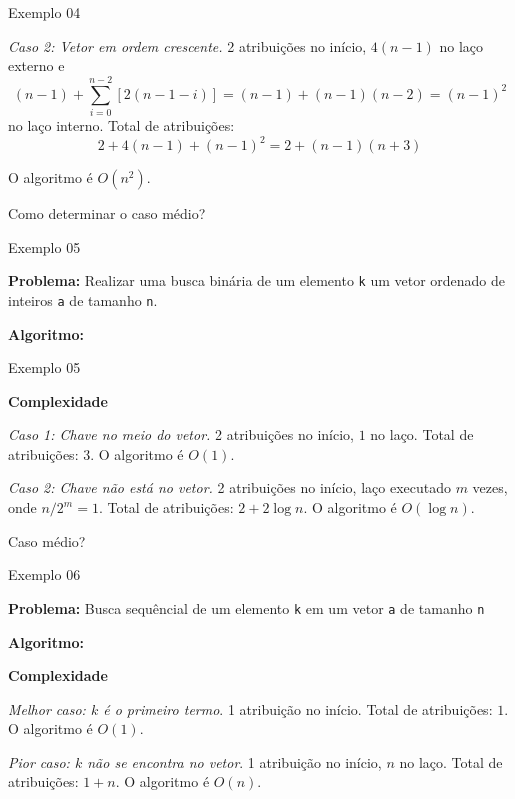 \begin{frame}[fragile]{Exemplo 04}

    {\it Caso 2: Vetor em ordem crescente.} 2 atribuições no 
    início, $4(n-1)$ no laço externo e 
    \[(n - 1) + \sum_{i=0}^{n-2} \left[2(n - 1 - i)\right] = (n - 1) + (n - 1)(n - 2) = (n - 1)^2\]
    no laço interno. {Total de atribuições:} 
    \[2 + 4(n-1) + (n-1)^2 = 2 + (n - 1)(n + 3)\]

    O algoritmo é $O(n^2)$. 

    \vspace{0.1in}
    Como determinar o caso médio?

\end{frame}

\begin{frame}[fragile]{Exemplo 05}

	{\bf Problema:} Realizar uma busca binária de um elemento \texttt{k} um vetor 
	ordenado de inteiros \texttt{a} de tamanho \texttt{n}.
	\vspace{0.1in}

    {\bf Algoritmo:} 
	\vspace{0.2in}
\end{frame}

\begin{frame}[fragile]{Exemplo 05}

    {\bf Complexidade} 
    \vspace{0.1in}

    {\it Caso 1: Chave no meio do vetor.} 2 atribuições no início, 
    $1$ no laço. {Total de atribuições:} $3$.  O algoritmo é $O(1)$.

    \vspace{0.1in}
    {\it Caso 2: Chave não está no vetor.} 2 atribuições no início, 
    laço executado $m$ vezes, onde $n/2^m = 1$.  {Total de atribuições:} $2 + 2\log n$. 
    O algoritmo é $O(\log n)$.

    \vspace{0.1in}
    Caso médio?
\end{frame}

\begin{frame}[fragile]{Exemplo 06}

	{\bf Problema:} Busca sequêncial de um elemento \texttt{k} em um vetor \texttt{a} 
	de tamanho \texttt{n}
	\vspace{0.1in}

	{\bf Algoritmo:} 
    \vspace{0.2in}

	{\bf Complexidade} 

	{\it Melhor caso: $k$ é o primeiro termo}. 1 atribuição no 
	início. {Total de atribuições:} $1$. 
	O algoritmo é $O(1)$.

	{\it Pior caso: $k$ não se encontra no vetor}. 1 atribuição no 
	início, $n$ no laço. {Total de atribuições:} 
	$1 + n$.  O algoritmo é $O(n)$.

\end{frame}

